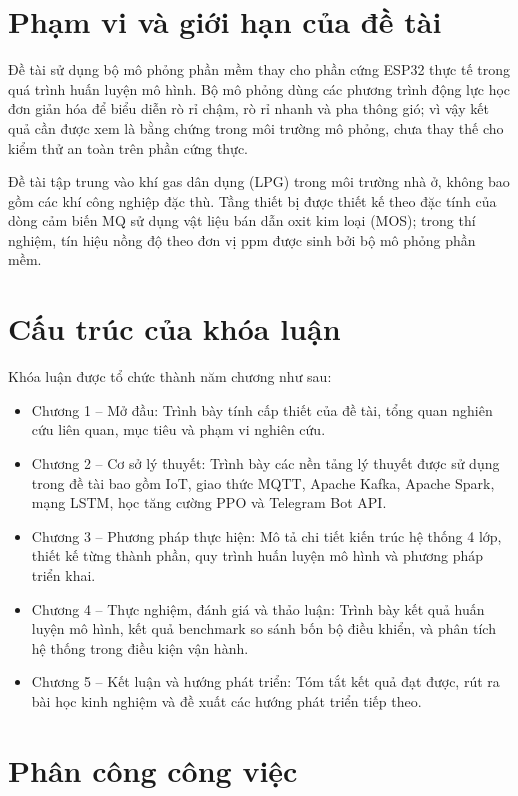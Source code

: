 \section{Phạm vi và giới hạn của đề tài}

Đề tài sử dụng bộ mô phỏng phần mềm thay cho phần cứng ESP32 thực tế trong quá trình huấn luyện mô hình. Bộ mô phỏng dùng các phương trình động lực học đơn giản hóa để biểu diễn rò rỉ chậm, rò rỉ nhanh và pha thông gió; vì vậy kết quả cần được xem là bằng chứng trong môi trường mô phỏng, chưa thay thế cho kiểm thử an toàn trên phần cứng thực.

Đề tài tập trung vào khí gas dân dụng (LPG) trong môi trường nhà ở, không bao gồm các khí công nghiệp đặc thù. Tầng thiết bị được thiết kế theo đặc tính của dòng cảm biến MQ sử dụng vật liệu bán dẫn oxit kim loại (MOS); trong thí nghiệm, tín hiệu nồng độ theo đơn vị ppm được sinh bởi bộ mô phỏng phần mềm.

\section{Cấu trúc của khóa luận}

Khóa luận được tổ chức thành năm chương như sau:

\begin{itemize}
  \item Chương 1 – Mở đầu: Trình bày tính cấp thiết của đề tài, tổng quan nghiên cứu liên quan, mục tiêu và phạm vi nghiên cứu.
  \item Chương 2 – Cơ sở lý thuyết: Trình bày các nền tảng lý thuyết được sử dụng trong đề tài bao gồm IoT, giao thức MQTT, Apache Kafka, Apache Spark, mạng LSTM, học tăng cường PPO và Telegram Bot API.
  \item Chương 3 – Phương pháp thực hiện: Mô tả chi tiết kiến trúc hệ thống 4 lớp, thiết kế từng thành phần, quy trình huấn luyện mô hình và phương pháp triển khai.
  \item Chương 4 – Thực nghiệm, đánh giá và thảo luận: Trình bày kết quả huấn luyện mô hình, kết quả benchmark so sánh bốn bộ điều khiển, và phân tích hệ thống trong điều kiện vận hành.
  \item Chương 5 – Kết luận và hướng phát triển: Tóm tắt kết quả đạt được, rút ra bài học kinh nghiệm và đề xuất các hướng phát triển tiếp theo.
\end{itemize}

\section{Phân công công việc}

